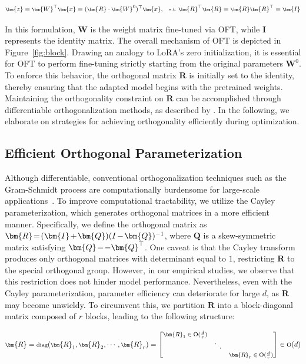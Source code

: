 \begin{equation}\label{eq:oft_general}
    \footnotesize
    \bm{z}=\bm{W}^\top\bm{x}=(\bm{R}\cdot\bm{W}^0)^\top\bm{x},~~~\text{s.t.}~\bm{R}^\top\bm{R}=\bm{R}\bm{R}^\top=\bm{I}
\end{equation}

In this formulation, $\bm{W}$ is the weight matrix fine-tuned via OFT, while $\bm{I}$ represents the identity matrix. The overall mechanism of OFT is depicted in Figure~\ref{fig:block}. Drawing an analogy to LoRA's zero initialization, it is essential for OFT to perform fine-tuning strictly starting from the original parameters $\bm{W}^0$. To enforce this behavior, the orthogonal matrix $\bm{R}$ is initially set to the identity, thereby ensuring that the adapted model begins with the pretrained weights. Maintaining the orthogonality constraint on $\bm{R}$ can be accomplished through differentiable orthogonalization methods, as described by \cite{liu2021orthogonal,lezcano2019cheap}. In the following, we elaborate on strategies for achieving orthogonality efficiently during optimization.

\subsection{Efficient Orthogonal Parameterization}\label{sect:eff_ortho}

Although differentiable, conventional orthogonalization techniques such as the Gram-Schmidt process are computationally burdensome for large-scale applications~\cite{liu2021orthogonal}. To improve computational tractability, we utilize the Cayley parameterization, which generates orthogonal matrices in a more efficient manner. Specifically, we define the orthogonal matrix as $\thickmuskip=2mu \medmuskip=2mu \bm{R}=(\bm{I}+\bm{Q})(I-\bm{Q})^{-1}$, where $\bm{Q}$ is a skew-symmetric matrix satisfying $\thickmuskip=2mu \medmuskip=2mu \bm{Q}=-\bm{Q}^\top$. One caveat is that the Cayley transform produces only orthogonal matrices with determinant equal to $1$, restricting $\bm{R}$ to the special orthogonal group. However, in our empirical studies, we observe that this restriction does not hinder model performance. Nevertheless, even with the Cayley parameterization, parameter efficiency can deteriorate for large $d$, as $\bm{R}$ may become unwieldy. To circumvent this, we partition $\bm{R}$ into a block-diagonal matrix composed of $r$ blocks, leading to the following structure:

\begin{equation}
    \footnotesize
    \bm{R}=\text{diag}(\bm{R}_1,\bm{R}_2,\cdots,\bm{R}_r)=\begin{bmatrix}
    \bm{R}_1\in \text{O}(\frac{d}{r}) &  &\\
    &\ddots & \\
    & & \bm{R}_r\in \text{O}(\frac{d}{r})
    \end{bmatrix}\in \text{O}(d)
\end{equation}

